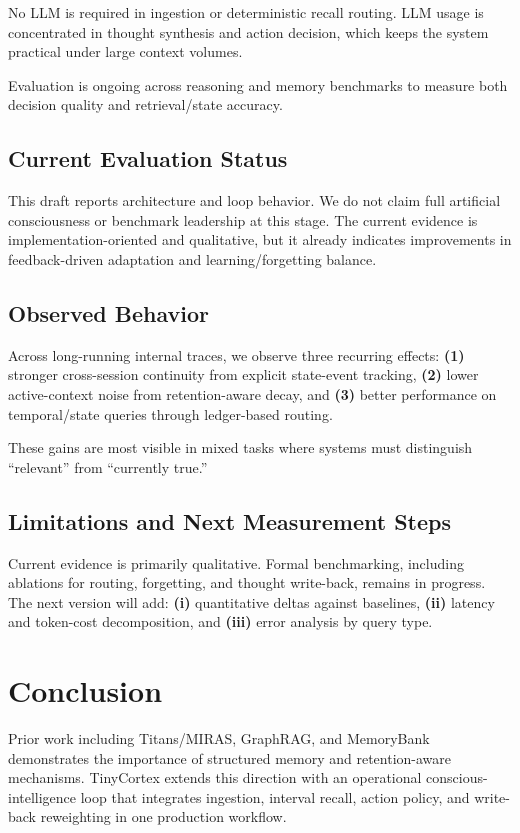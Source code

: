 \documentclass{article}
\begin{document}
No LLM is required in ingestion or deterministic recall routing. LLM usage is
concentrated in thought synthesis and action decision, which keeps the system
practical under large context volumes.

Evaluation is ongoing across reasoning and memory benchmarks to measure both
decision quality and retrieval/state accuracy.

\subsection{Current Evaluation Status}

This draft reports architecture and loop behavior. We do not claim full
artificial consciousness or benchmark leadership at this stage. The current
evidence is implementation-oriented and qualitative, but it already indicates
improvements in feedback-driven adaptation and learning/forgetting balance.

\subsection{Observed Behavior}

Across long-running internal traces, we observe three recurring effects:
\textbf{(1)} stronger cross-session continuity from explicit state-event
tracking,
\textbf{(2)} lower active-context noise from retention-aware decay, and
\textbf{(3)} better performance on temporal/state queries through ledger-based
routing.

These gains are most visible in mixed tasks where systems must distinguish
``relevant'' from ``currently true.''

\subsection{Limitations and Next Measurement Steps}

Current evidence is primarily qualitative. Formal benchmarking, including
ablations for routing, forgetting, and thought write-back, remains in
progress. The next version will add:
\textbf{(i)} quantitative deltas against baselines,
\textbf{(ii)} latency and token-cost decomposition, and
\textbf{(iii)} error analysis by query type.


\section{Conclusion}

Prior work including Titans/MIRAS, GraphRAG, and MemoryBank demonstrates the
importance of structured memory and retention-aware mechanisms. TinyCortex
extends this direction with an operational conscious-intelligence loop that
integrates ingestion, interval recall, action policy, and write-back
reweighting in one production workflow.
\end{document}
